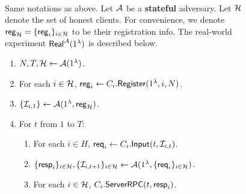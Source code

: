 \begin{figure}[h!]
\begin{framed}
\begin{definition} \hfill\\
\label{defn:real-world}
Same notations as above. Let $\mathcal{A}$ be a \textbf{stateful} adversary. Let $\mathcal{H}$ denote the set of honest clients. For convenience, we denote $\mathsf{reg}_{\mathcal{H}} = \{\mathsf{reg}_i\}_{i \in\mathcal{H}}$ to be their registration info. The real-world experiment $\mathsf{Real}^{\mathcal{A}}(1^{\lambda})$ is described below.
\begin{enumerate}
\item $N, T, \mathcal{H} \leftarrow \mathcal{A}(1^{\lambda})$.
\item For each $i \in \mathcal{H}$, $\mathsf{reg}_i \leftarrow C_i.\mathsf{Register}(1^{\lambda}, i, N)$. 
\item $\{\mathcal{I}_{i, 1}\} \leftarrow \mathcal{A}(1^{\lambda}, \mathsf{reg}_{\mathcal{H}})$.
\item For $t$ from $1$ to $T$:
    \begin{enumerate}
    \item For each $i \in H$, $\mathsf{req}_i \leftarrow C_i.\mathsf{Input}(t, \mathcal{I}_{i, t})$.
    
    \item $\{\mathsf{resp}_i\}_{i \in \mathcal{H}}, \{\mathcal{I}_{i, t + 1}\}_{i \in \mathcal{H}} \leftarrow \mathcal{A}(1^{\lambda}, \{\mathsf{req}_i\}_{i \in \mathcal{H}})$.
    
    \item For each $i \in \mathcal{H}$, $C_i.\mathsf{ServerRPC}(t, \mathsf{resp}_i)$.
    \end{enumerate}
\end{enumerate}
\end{definition}
\end{framed}
\end{figure}

